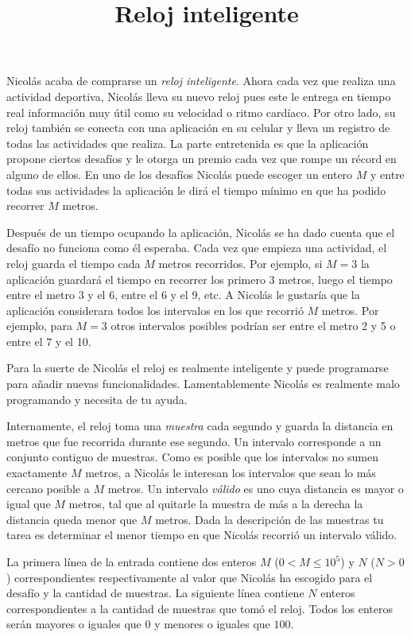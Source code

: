 \documentclass{oci}
\title{Reloj inteligente}
\begin{document}
\begin{problemDescription}
  Nicolás acaba de comprarse un \emph{reloj inteligente}.
  Ahora cada vez que realiza una actividad deportiva, Nicolás lleva su nuevo
  reloj pues este le entrega en tiempo real información muy útil como su
  velocidad o ritmo cardíaco.
  Por otro lado, su reloj también se conecta con una aplicación en su celular y
  lleva un registro de todas las actividades que realiza.
  La parte entretenida es que la aplicación propone ciertos desafíos y le otorga
  un premio cada vez que rompe un récord en alguno de ellos.
  En uno de los desafíos Nicolás puede escoger un entero $M$ y entre todas sus
  actividades la aplicación le dirá el tiempo mínimo en que ha podido recorrer
  $M$ metros.

  Después de un tiempo ocupando la aplicación, Nicolás se ha dado cuenta que el
  desafío no funciona como él esperaba.
  Cada vez que empieza una actividad, el reloj guarda el tiempo cada $M$
  metros recorridos.
  Por ejemplo, si $M=3$ la aplicación guardará el tiempo en
  recorrer los primero 3 metros, luego el tiempo entre el metro 3 y
  el 6, entre el 6 y el 9, etc.
  A Nicolás le gustaría que la aplicación considerara todos los intervalos en
  los que recorrió $M$ metros.
  Por ejemplo, para $M=3$ otros intervalos posibles podrían ser entre el
  metro 2 y 5 o entre el 7 y el 10.

  Para la suerte de Nicolás el reloj es realmente inteligente y puede
  programarse para añadir nuevas funcionalidades.
  Lamentablemente Nicolás es realmente malo programando y necesita de tu ayuda.

  Internamente, el reloj toma una \emph{muestra} cada segundo y guarda la
  distancia en metros que fue recorrida durante ese segundo.
  Un intervalo corresponde a un conjunto contiguo de muestras.
  Como es posible que los intervalos no sumen exactamente $M$ metros, a
  Nicolás le interesan los intervalos que sean lo más cercano posible a $M$
  metros.
  Un intervalo \emph{válido} es uno cuya distancia es mayor o igual que $M$ metros,
  tal que al quitarle la muestra de más a la derecha la distancia queda menor
  que $M$ metros.
  Dada la descripción de las muestras tu tarea es determinar el menor tiempo en
  que Nicolás recorrió un intervalo válido.
\end{problemDescription}

\begin{inputDescription}
  La primera línea de la entrada contiene dos enteros $M$ ($0<M\leq 10^5$) y $N$
  ($N > 0$) correspondientes respectivamente al valor que Nicolás ha escogido
  para el desafío y la cantidad de muestras.
  La siguiente línea contiene $N$ enteros correspondientes a la cantidad de
  muestras que tomó el reloj.
  Todos los enteros serán mayores o iguales que 0 y menores o iguales que $100$.
\end{inputDescription}
\end{document}
